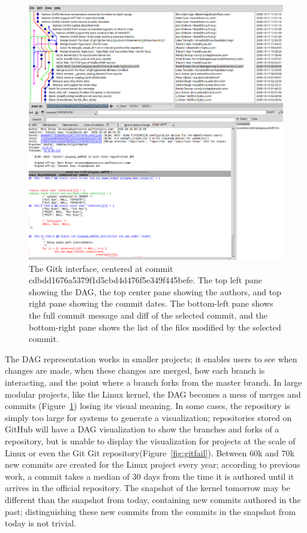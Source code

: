 \documentclass[conference, draftclsnofoot, draft]{IEEEtran}
\begin{document}
\begin{figure}
  \centering
  \includegraphics[width=0.8\linewidth]{figures/gitk.png}
  \caption{
    The Gitk interface, centered at commit
    cdbdd1676a5379f1d5cbd4d476f5e349f445befe. The top left pane showing
    the DAG, the top center pane showing the authors, and top right pane
    showing the commit dates. The bottom-left pane shows the full
    commit message and diff of the selected commit, and the bottom-right
    pane shows the list of the files modified by the selected commit.
  }
  \label{fig:gitk}
\end{figure}


The DAG representation works in smaller projects; it enables users to
see when changes are made, when these changes are merged, how each
branch is interacting, and the point where a branch forks from the
master branch. In large modular projects, like the Linux kernel, the DAG
becomes a mess of merges and commits (Figure~\ref{fig:gitk}) losing its
visual meaning. In some cases, the repository is simply too large for
systems to generate a visualization; repositories stored on GitHub will
have a DAG visualization to show the branches and forks of a
repository, but is unable to display the visualization for projects at
the scale of Linux or even the Git Git
repository(Figure~\ref{fig:gitfail}). Between 60k and 70k new commits
are created for the Linux project every year; according to previous
work\cite{German2015}, a commit takes a median of 30 days from the time
it is authored until it arrives in the official repository. The snapshot
of the kernel tomorrow may be different than the snapshot from today,
containing new commits authored in the past; distinguishing these new
commits from the commits in the snapshot from today is not trivial.
\end{document}
